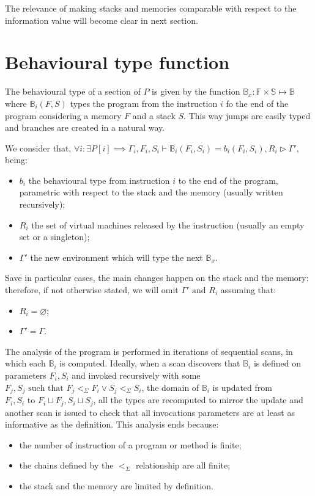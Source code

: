 \documentclass{amsart}
\newcommand{\bB}[1]{\mathbb{B}_{#1}}
\newcommand{\bF}{\mathbb{F}}
\newcommand{\bS}{\mathbb{S}}
\newcommand{\less}{<_\Sigma}
\renewcommand{\emptyset}{\varnothing}
\numberwithin{equation}{section}
\theoremstyle{plain} %
\theoremstyle{definition}
\theoremstyle{remark}
\begin{document}
The relevance of making stacks and memories comparable with respect to the information value will become clear in next section.


\section{Behavioural type function}
The behavioural type of a section of $P$ is given by the function $\bB{x}:\bF{} \times \bS{} \mapsto \bB{}$ where $\bB{i}(F, S)$ types the program from the instruction $i$ fo the end of the program considering a memory $F$ and a stack $S$. This way jumps are easily typed and branches are created in a natural way.

We consider that, $\forall i: \exists P[i] \implies \Gamma_i, F_i, S_i \vdash \bB{i}(F_i, S_i) = b_i(F_i, S_i), R_i \rhd \Gamma'$, being:
\begin{itemize}
\item $b_i$ the behavioural type from instruction $i$ to the end of the program, parametric with respect to the stack and the memory (usually written recursively);
\item $R_i$ the set of virtual machines released by the instruction (usually an empty set or a singleton);
\item $\Gamma'$ the new environment which will type the next $\bB{x}$.
\end{itemize}
Save in particular cases, the main changes happen on the stack and the memory: therefore, if not otherwise stated, we will omit $\Gamma' \text{ and } R_i$ assuming that:
\begin{itemize}
\item $R_i = \emptyset$;
\item $\Gamma' = \Gamma$.
\end{itemize}

The analysis of the program is performed in iterations of sequential scans, in which each $\bB{i}$ is computed. Ideally, when a scan discovers that $\bB{i}$ is defined on parameters $F_i, S_i$ and invoked recursively with some $F_j, S_j \text{ such that } F_j \less{} F_i \vee S_j \less{} S_i$, the domain of $\bB{i}$ is updated from $F_i, S_i \text{ to } F_i \sqcup F_j, S_i \sqcup S_j$, all the types are recomputed to mirror the update and another scan is issued to check that all invocations parameters are at least as informative as the definition. This analysis ends because:
\begin{itemize}
\item the number of instruction of a program or method is finite;
\item the chains defined by the $\less$ relationship are all finite;
\item the stack and the memory are limited by definition.
\end{itemize}
\end{document}
